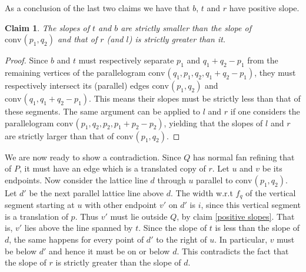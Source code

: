 \documentclass{amsart}
\theoremstyle{plain}
\newtheorem{claim}[theorem]{Claim}
\theoremstyle{definition}
\newcommand{\conv}{\ensuremath{\mathrm{conv}}\hspace{1pt}}
\begin{document}
As a conclusion of the last two claims we have that $b$, $t$ and $r$ have positive slope.

%
%
%

\begin{claim}
The slopes of $t$ and $b$ are strictly smaller than the slope of $\conv(p_1, q_2)$ and that of $r$ (and $l$) is strictly greater than it.
\end{claim}

\begin{proof}
Since $b$ and $t$ must respectively separate $p_1$ and $q_1+q_2-p_1$ from the remaining vertices of the parallelogram $\conv(q_1, p_1, q_2, q_1+q_2-p_1)$, they must respectively intersect its (parallel) edges $\conv(p_1, q_2)$ and $\conv(q_1, q_1+q_2-p_1)$. This means their slopes must be strictly less than that of these segments. The same argument can be applied to $l$ and $r$ if one considers the parallelogram  $\conv(p_1, q_2, p_2, p_1+p_2-p_2)$, yielding that the slopes of $l$ and $r$ are strictly larger than that of $\conv(p_1, q_2)$.
\end{proof}

We are now ready to show a contradiction. Since $Q$ has normal fan refining that of $P$, it must have an edge which is a translated copy of $r$. Let $u$ and $v$ be its endpoints. Now consider the lattice line $d$ through $u$ parallel to  $\conv(p_1, q_2)$. Let $d'$ be the next parallel lattice line above $d$. The width w.r.t $f_q$ of the vertical segment starting at $u$ with other endpoint $v'$ on $d'$ is $i$, since this vertical segment is a translation of $p$. Thus $v'$ must lie outside $Q$, by claim \ref{positive slopes}. That is, $v'$ lies above the line spanned by $t$. Since the slope of $t$ is less than the slope of $d$, the same happens for every point of $d'$ to the right of $u$. In particular, $v$ must be below $d'$ and hence it must be on or below $d$. This contradicts the fact that the slope of $r$ is strictly greater than the slope of $d$. 
\end{document}
